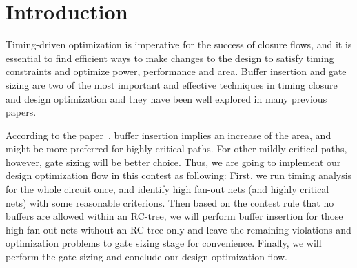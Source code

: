 \section{Introduction}
Timing-driven optimization is imperative for the success of closure flows, and it is essential to find efficient ways to make changes to the design to satisfy timing constraints and optimize power, performance and area. Buffer insertion and gate sizing are two of the most important and effective techniques in timing closure and design optimization and they have been well explored in many previous papers. 

According to the paper~\cite{Jiang:Interleaving}, buffer insertion implies an increase of the area, and might be more preferred for highly critical paths. For other mildly critical paths, however, gate sizing will be better choice. Thus, we are going to implement our design optimization flow in this contest as following: First, we run timing analysis for the whole circuit once, and identify high fan-out nets (and highly critical nets) with some reasonable criterions. Then based on the contest rule that no buffers are allowed within an RC-tree, we will perform buffer insertion for those high fan-out nets without an RC-tree only and leave the remaining violations and optimization problems to gate sizing stage for convenience. Finally, we will perform the gate sizing and conclude our design optimization flow.




